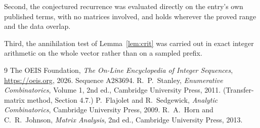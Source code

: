\documentclass[11pt,a4paper]{article}
\theoremstyle{plain}
\theoremstyle{definition}
\begin{document}
Second, the conjectured recurrence was evaluated directly on the entry's own published terms,
with no matrices involved, and holds wherever the proved range and the data overlap.

Third, the annihilation test of Lemma~\ref{lem:crit} was carried out in exact integer
arithmetic on the whole vector rather than on a sampled prefix.

\begin{thebibliography}{9}
 The OEIS Foundation, \emph{The On-Line Encyclopedia of Integer
Sequences}, \url{https://oeis.org}, 2026. Sequence A283694.
 R.~P.~Stanley, \emph{Enumerative Combinatorics}, Volume 1, 2nd ed.,
Cambridge University Press, 2011. (Transfer-matrix method, Section 4.7.)
 P.~Flajolet and R.~Sedgewick, \emph{Analytic Combinatorics}, Cambridge
University Press, 2009.
 R.~A.~Horn and C.~R.~Johnson, \emph{Matrix Analysis}, 2nd ed., Cambridge
University Press, 2013.
\end{thebibliography}
\end{document}
